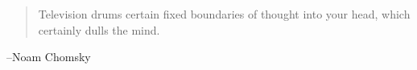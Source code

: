 \documentclass[letterpaper, landscape]{exam}
\begin{document}
  \fi
  \ifprintanswers{}
  \else
    \vspace{7 cm}
    \begin{quote}
      \begin{em}
        Television drums certain fixed boundaries of thought into your head, which certainly dulls the mind. 
      \end{em}
    \end{quote}
    \hspace{2 cm}--Noam Chomsky
  \fi
\end{document}

